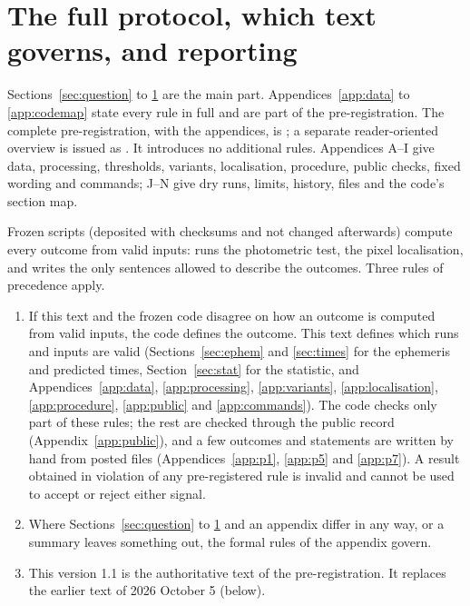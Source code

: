 \section{The full protocol, which text governs, and reporting} \label{sec:protocol}

 Sections~\ref{sec:question} to \ref{sec:protocol} are the main part. Appendices~\ref{app:data}
to \ref{app:codemap} state every rule in full and are part of the pre-registration. The complete pre-registration, with
the appendices, is ; a separate reader-oriented overview is issued as
. It introduces no additional rules. Appendices A--I give data, processing, thresholds, variants, localisation, procedure, public checks,
fixed wording and commands; J--N give dry runs, limits, history, files and the code's section map.

 Frozen scripts (deposited with checksums and not changed
afterwards) compute every outcome from valid inputs:  runs the photometric test,
 the pixel localisation, and  writes the only sentences allowed to
describe the outcomes. Three rules of precedence apply.
\begin{enumerate}
\item If this text and the frozen code disagree on how an outcome is computed from valid inputs, the code defines the
  outcome. This text defines which runs and inputs are valid (Sections~\ref{sec:ephem} and \ref{sec:times} for the
  ephemeris and predicted times, Section~\ref{sec:stat} for the statistic, and Appendices~\ref{app:data}, \ref{app:processing}, \ref{app:variants},
  \ref{app:localisation}, \ref{app:procedure}, \ref{app:public} and \ref{app:commands}). The code checks only part of
  these rules; the rest are checked through the public record (Appendix~\ref{app:public}), and a few outcomes and
  statements are written by hand from posted files (Appendices~\ref{app:p1}, \ref{app:p5} and \ref{app:p7}). A result obtained in violation of any pre-registered rule
  is invalid and cannot be used to accept or reject either signal.
\item Where Sections~\ref{sec:question} to \ref{sec:protocol} and an appendix differ in any way, or a summary leaves
  something out, the formal rules of the appendix govern.
\item This version 1.1 is the authoritative text of the pre-registration. It replaces the earlier text of 2026 October
  5 (below).
\end{enumerate}

